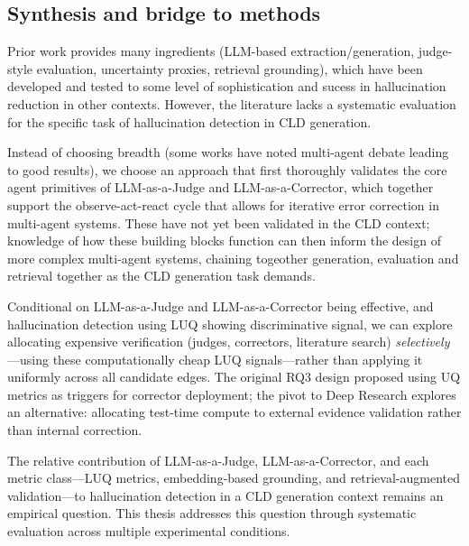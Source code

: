 \subsection{Synthesis and bridge to methods}
\label{sec:lit_bridge_to_methods}

Prior work provides many ingredients (LLM-based extraction/generation, judge-style evaluation, uncertainty proxies, retrieval grounding), which have been developed and tested to some level of sophistication and sucess in hallucination reduction in other contexts. However, the literature lacks a systematic evaluation for the specific task of hallucination detection in CLD generation.

Instead of choosing breadth (some works have noted multi-agent debate leading to good results), we choose an approach that first thoroughly validates the core agent primitives of LLM-as-a-Judge and LLM-as-a-Corrector, which together support the observe-act-react cycle that allows for iterative error correction in multi-agent systems. These have not yet been validated in the CLD context; knowledge of how these building blocks function can then inform the design of more complex multi-agent systems, chaining togeother generation, evaluation and retrieval together as the CLD generation task demands.

Conditional on LLM-as-a-Judge and LLM-as-a-Corrector being effective, and hallucination detection using LUQ showing discriminative signal, we can explore allocating expensive verification (judges, correctors, literature search) \emph{selectively}---using these computationally cheap LUQ signals---rather than applying it uniformly across all candidate edges. The original RQ3 design proposed using UQ metrics as triggers for corrector deployment; the pivot to Deep Research explores an alternative: allocating test-time compute to external evidence validation rather than internal correction.

The relative contribution of LLM-as-a-Judge, LLM-as-a-Corrector, and each metric class---LUQ metrics, embedding-based grounding, and retrieval-augmented validation---to hallucination detection in a CLD generation context remains an empirical question. This thesis addresses this question through systematic evaluation across multiple experimental conditions.